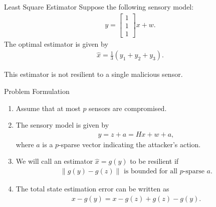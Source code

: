 \documentclass[10pt]{beamer}
\begin{document}
\begin{frame}{Least Square Estimator}
  Suppose the following sensory model:
  \begin{align*}
    y = \begin{bmatrix}
      1\\
      1\\
      1
    \end{bmatrix}x + w.
  \end{align*}
  The optimal estimator is given by
  \begin{align*}
    \hat x = \frac{1}{3}\left(y_1+y_2+y_3\right).
  \end{align*}
  
  This estimator is not resilient to a single malicious sensor.
\end{frame}

\begin{frame}{Problem Formulation}
  \begin{enumerate}
  \item Assume that at most $p$ sensors are compromised.
  \item The sensory model is given by
    \begin{align*}
      y = z + a = Hx + w +a,
    \end{align*}
    where $a$ is a $p$-sparse vector indicating the attacker's action.
  \item We will call an estimator $\hat x = g(y)$ to be resilient if
    \begin{align*}
      \|g(y) - g(z)\|\text{ is bounded for all $p$-sparse $a$}.
    \end{align*}
  \item The total state estimation error can be written as
    \begin{align*}
      x-g(y) = x-g(z) + g(z)-g(y).
    \end{align*}

  \end{enumerate}
\end{frame}
\end{document}
